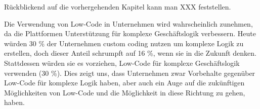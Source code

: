 \documentclass[12pt]{article} %
\begin{document}
	Rückblickend auf die vorhergehenden Kapitel kann man XXX feststellen.
	
	
	
	
	Die Verwendung von Low-Code in Unternehmen wird wahrscheinlich zunehmen, da die Plattformen
	Unterstützung für komplexe Geschäftslogik verbessern. Heute würden 30 \% der Unternehmen custom coding nutzen um komplexe Logik zu erstellen, doch dieser Anteil schrumpft auf 16 \%, wenn sie in die Zukunft denken. Stattdessen würden sie es vorziehen, Low-Code für komplexe Geschäftslogik verwenden (30 \%). Dies zeigt uns, dass Unternehmen zwar Vorbehalte gegenüber Low-Code für komplexe Logik haben, aber auch ein Auge auf die zukünftigen Möglichkeiten von Low-Code und
	die Möglichkeit in diese Richtung zu gehen, haben. \cite{EmmaVanPelt.2019}
	
	\newpage	
	\printbibliography[title={\section{Referenzen}}] %
	
\end{document}
